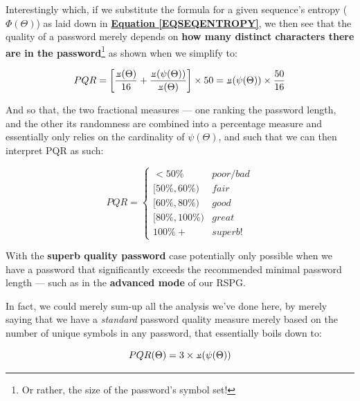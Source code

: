 \documentclass[a4paper, 18pt]{book} %
\newcommand{\invpi}{\rotatebox[origin=c]{180}{$\pi$}}
\begin{document}
{{{\begin{enumerate}
{Interestingly which, if we substitute the formula for a given sequence's entropy ($\Phi(\Theta)$) as laid down in \textbf{\hyperref[EQSEQENTROPY]{Equation \ref{EQSEQENTROPY}}}, we then see that the quality of a password merely depends on \textbf{how many distinct characters there are in the password}\footnote{Or rather, the size of the password's symbol set!} as shown when we simplify to:

\vspace{1em}
\begin{equation}
PQR =  \left[\frac{\invpi(\Theta)}{16} + \frac{\invpi(\psi(\Theta))}{\invpi(\Theta)} \right] \times 50 =  \invpi(\psi(\Theta)) \times \frac{ 50}{16}
\end{equation}
\vspace{1em}


And so that, the two fractional measures --- one ranking the password length, and the other its randomness are combined into a percentage measure and essentially only relies on the cardinality of $\psi(\Theta)$, and such that we can then interpret PQR as such:

\vspace{1em}
\begin{equation}
PQR = \begin{cases}
< 50\% & poor / bad\\
[50\%,60\%) & fair \\
[60\%,80\%) & good \\
[80\%,100\%) & great\\
100\%+ & superb!
\end{cases}
\end{equation}
\vspace{1em}

With the \textbf{superb quality password} case potentially only possible when we have a password that significantly exceeds the recommended minimal password length --- such as in the \textbf{advanced mode} of our RSPG.

  }
\end{enumerate}

\vspace{2em}

In fact, we could merely sum-up all the analysis we've done here, by merely saying that we have a \textit{standard} password quality measure merely based on the number of unique symbols in any password, that essentially boils down to:


\vspace{1em}
\begin{equation}
PQR(\Theta) =  3 \times \invpi(\psi(\Theta))
\end{equation}
\vspace{1em}

}}}
\end{document}
